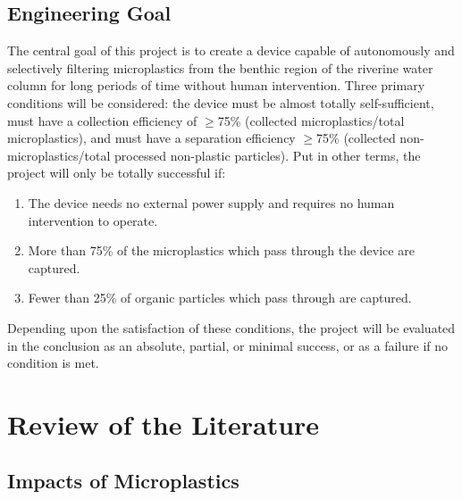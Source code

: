 \documentclass[fleqn,10pt]{SelfArx} %
\begin{document}
	\subsection{Engineering Goal}
	\label{sec:goals}
	The central goal of this project is to create a device capable of autonomously and selectively filtering microplastics from the benthic region of the riverine water column for long periods of time without human intervention. Three primary conditions will be considered: the device must be almost totally self-sufficient, must have a collection efficiency of $\geq$75\% (collected microplastics/total microplastics), and must have a separation efficiency $\geq$75\% (collected non-microplastics/total processed non-plastic particles). Put in other terms, the project will only be totally successful if:
	\begin{enumerate}
		\item The device needs no external power supply and requires no human intervention to operate.
		\item More than 75\% of the microplastics which pass through the device are captured.
		\item Fewer than 25\% of organic particles which pass through are captured.	
	\end{enumerate}
	Depending upon the satisfaction of these conditions, the project will be evaluated in the conclusion as an absolute, partial, or minimal success, or as a failure if no condition is met.
	\section{Review of the Literature}
	\subsection{Impacts of Microplastics}
\end{document}
